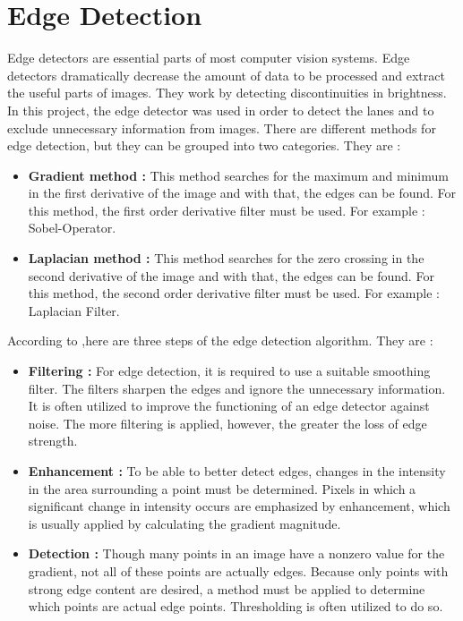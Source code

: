 %
\section{Edge Detection}\label{sec:Edge Detection}
%

Edge detectors are essential parts of most computer vision systems. Edge detectors dramatically decrease the amount of data to be processed and extract the useful parts of images. They work by detecting discontinuities in brightness. In this project, the edge detector was used in order to detect the lanes and to exclude unnecessary information from images. There are different methods for edge detection, but they can be grouped into two categories. They are :

\begin{itemize}

\item \textbf{Gradient method : } This method searches for the maximum and minimum in the first derivative of the image and with that, the edges can be found. For this method, the first order derivative filter must be used. For example : Sobel-Operator.
 
\item \textbf{Laplacian method : } This method searches for the zero crossing in the second derivative of the image and with that, the edges can be found. For this method, the second order derivative filter must be used. For example : Laplacian Filter. 
  
\end{itemize}
 
According to \cite{Machine_Vision},here are three steps of the edge detection algorithm. They are :

\begin{itemize}

\item \textbf{Filtering : } For edge detection, it is required to use a suitable smoothing filter. The filters sharpen the edges and ignore the unnecessary information. It is often utilized to improve the functioning of an edge detector against noise. The more filtering is applied, however, the greater the loss of edge strength.
 
\item \textbf{Enhancement : } To be able to better detect edges, changes in the intensity in the area surrounding a point must be determined. Pixels in which a significant change in intensity occurs are emphasized by enhancement, which is usually applied by calculating the gradient magnitude.
  
\item \textbf{Detection : } Though many points in an image have a nonzero value for the gradient, not all of these points are actually edges. Because only points with strong edge content are desired, a method must be applied to determine which points are actual edge points. Thresholding is often utilized to do so.
 
\end{itemize}

